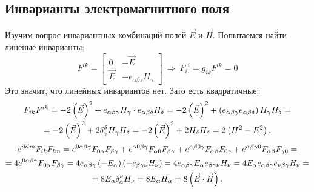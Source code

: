 \subsection{Инварианты электромагнитного поля}
    Изучим вопрос инвариантных комбинаций полей $\vec{E}$ и $\vec{H}$. Попытаемся найти линеные инварианты:
    \[
        F^{ik} = \begin{bmatrix}
            0 & -\vec{E} \\
            \vec{E} & -e_{\alpha\beta\gamma}H_{\gamma}
        \end{bmatrix} \: \Rightarrow \: {F_i}^i = g_{ik}F^{ik} = 0
    \]
    Это значит, что линейных инвариантов нет. Зато есть квадратичные:
        \begin{gather*}
            F_{ik}F^{ik} = -2\left({\vec{E}}\right)^2 + e_{\alpha\beta\gamma}H_{\gamma}\cdot e_{\alpha\beta\delta}H_{\delta} = 
            -2\left({\vec{E}}\right)^2 + \left({e_{\alpha\beta\gamma} e_{\alpha\beta\delta}}\right)H_{\gamma}H_{\delta} = \\
            = -2\left({\vec{E}}\right)^2 + 2\delta_{\gamma}^{\delta}H_{\gamma}H_{\delta} = -2\left({\vec{E}}\right)^2 + 2H_{\delta}H_{\delta}
            = 2\left({H^2 - E^2}\right).
        \end{gather*}
        \begin{gather*}
            e^{iklm}F_{ik}F_{lm} =
            e^{0\alpha\beta\gamma}F_{0\alpha}F_{\beta\gamma} +
            e^{\alpha 0\beta\gamma}F_{\alpha 0}F_{\beta\gamma} +
            e^{\alpha\beta 0\gamma}F_{\alpha\beta}F_{0\gamma} +
            e^{\alpha\beta\gamma 0}F_{\alpha\beta}F_{\gamma 0} = \\
            = 4e^{0\alpha\beta\gamma}F_{0\alpha}F_{\beta\gamma} =
            4e_{\alpha\beta\gamma} \left({-E_{\alpha}}\right)\left({-e_{\beta\gamma\nu}H_{\nu}}\right) =
            4e_{\alpha\beta\gamma}E_{\alpha}e_{\beta\gamma\nu}H_{\nu} = 4E_{\alpha}e_{\alpha\beta\gamma}e_{\nu\beta\gamma}H_{\nu} = \\
            = 8E_{\alpha}\delta_{\alpha}^{\nu}H_{\nu} = 8E_{\alpha}H_{\alpha} = 8\left({\vec{E}\cdot\vec{H}}\right).
        \end{gather*}

